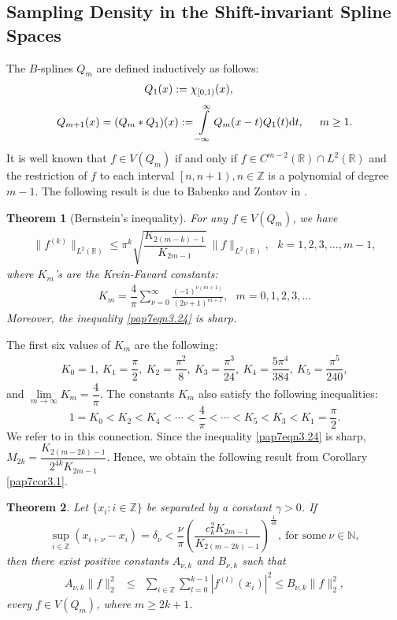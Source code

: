 \documentclass[a4paper,12pt,reqno]{amsart}
\theoremstyle{plain}
\newtheorem{thm}{Theorem}[section]
\numberwithin{equation}{section}
\theoremstyle{definition}
\newcounter {own}
\newcommand{\ds}{\displaystyle}
\begin{document}
\subsection{Sampling Density in the Shift-invariant Spline Spaces}
The $B$-splines $Q_m$ are defined inductively as follows:
\begin{align*}
\hspace*{-1cm}Q_1(x):=\chi_{[0,1)}(x),
\end{align*}
\begin{align*}
Q_{m+1}(x)=
(Q_m*Q_1)(x):=\displaystyle{\int\limits_{-\infty}^{\infty}Q_m(x-t)Q_1(t)\mathrm{d}t},
\hspace*{0.5cm}m\geq1.
\end{align*}
It is well known that $f\in V(Q_m)$ if and only if $f\in C^{m-2}(\mathbb{R})\cap L^2(\mathbb{R})$ and the restriction of $f$ to each interval $\left[n,n+1\right),n\in\mathbb{Z}$ is a polynomial of degree $m-1$.
The following result is due to Babenko and Zontov in \cite{BaZo}.
\begin{thm}[Bernstein's inequality]\label{pap2thmBernineq}
For any $f\in V(Q_m)$,  we have
\begin{eqnarray}\label{pap7eqn3.24}
\|f^{(k)}\|_{L^2(\mathbb{R})}\leq \pi^k \sqrt{\dfrac{K_{2(m-k)-1}}{K_{2m-1}}}~\|f\|_{L^2(\mathbb{R})},~~~ k=1,2,3,\dots,m-1,
\end{eqnarray}
where $K_m$'s are the Krein-Favard constants:
\begin{eqnarray*}
K_m=\dfrac{4}{\pi}\sum\limits_{\nu=0}^{\infty}\frac{(-1)^{\nu(m+1)}}{(2\nu+1)^{m+1}},~~~m=0,1,2,3,\dots
\end{eqnarray*}
Moreover, the inequality \eqref{pap7eqn3.24} is sharp.
\end{thm}
The first six values of $K_m$ are the following:
\begin{align*}
K_0=1,~K_1=\dfrac{\pi}{2},~ K_2=\dfrac{\pi^2}{8}, ~K_3=\dfrac{\pi^3}{24},~ K_4=\dfrac{5\pi^4}{384}, ~ K_5=\dfrac{\pi^5}{240},
\end{align*}
and $\lim\limits_{m\to\infty}K_m=\dfrac{4}{\pi}$. The constants $K_m$ also satisfy the following inequalities:
$$1=K_0<K_2<K_4<\cdots<\dfrac{4}{\pi}<\cdots<K_5<K_3<K_1=\dfrac{\pi}{2}.$$
We refer to \cite{GoFe} in this connection. Since the inequality \eqref{pap7eqn3.24} is sharp,  $M_{2k}=\dfrac{K_{2(m-2k)-1}}{2^{4k}K_{2m-1}}$. Hence, we obtain the following result from Corollary \ref{pap7cor3.1}.
\begin{thm}
Let $\{x_i:{i\in\mathbb{Z}}\}$ be separated by a constant $\gamma>0$.
If  
$$\sup\limits_{i\in\mathbb{Z}}(x_{i+\nu}-x_i)=\delta_\nu<\dfrac{\nu}{\pi}\left(\dfrac{c_{k}^2K_{2m-1}}{K_{2(m-2k)-1}}\right)^{\frac{1}{4k}},~\text{for some}~\nu\in\mathbb{N},$$
then  there exist positive constants 
$A_{\nu,k}$  and $B_{\nu,k}$ such that
\begin{eqnarray}\label{pap3eqn2.7}
A_{\nu,k}\| f\|_2^2&\leq&\ds\sum\limits_{i\in\mathbb{Z}}
\ds\sum\limits_{l=0}^{k-1}|f^{(l)}(x_i)|^2\leq B_{\nu,k}\| f\|_2^2,
\end{eqnarray}
every $f\in V(Q_m)$, where $m\geq 2k+1$.
\end{thm}
\end{document}
